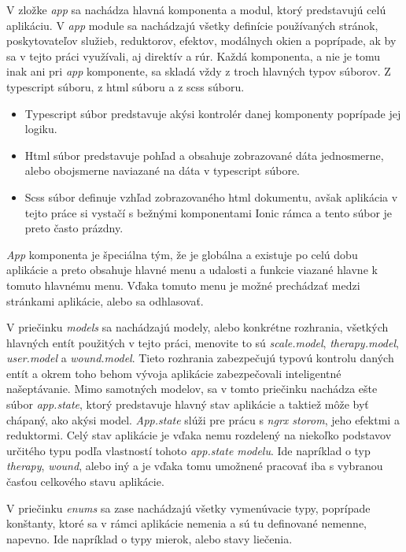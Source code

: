 V zložke \textit{app} sa nachádza hlavná komponenta a modul, ktorý predstavujú celú aplikáciu. V \textit{app} module sa nachádzajú všetky definície používaných stránok, poskytovateľov služieb, reduktorov, efektov, modálnych okien a poprípade, ak by sa v tejto práci využívali, aj direktív a rúr. Každá komponenta, a nie je tomu inak ani pri \textit{app} komponente, sa skladá vždy z troch hlavných typov súborov. Z typescript súboru, z html súboru a z scss súboru. 
\begin{itemize}
\item Typescript súbor predstavuje akýsi kontrolér danej komponenty poprípade jej logiku. 
\item Html súbor predstavuje pohľad a obsahuje zobrazované dáta jednosmerne, alebo obojsmerne naviazané na dáta v typescript súbore. 
\item Scss súbor definuje vzhľad zobrazovaného html dokumentu, avšak aplikácia v tejto práce si vystačí s bežnými komponentami Ionic rámca a tento súbor je preto často prázdny.
\end{itemize}
\textit{App} komponenta je špeciálna tým, že je globálna a existuje po celú dobu aplikácie a
preto obsahuje hlavné menu a udalosti a funkcie viazané hlavne k tomuto hlavnému menu. Vďaka tomuto menu je možné prechádzať medzi stránkami aplikácie, alebo sa odhlasovať.

V priečinku \textit{models} sa nachádzajú modely, alebo konkrétne rozhrania, všetkých hlavných entít použitých v tejto práci, menovite to sú \textit{scale.model}, \textit{therapy.model}, \textit{user.model} a \textit{wound.model}. Tieto rozhrania zabezpečujú typovú kontrolu daných entít a okrem toho behom vývoja aplikácie zabezpečovali inteligentné našeptávanie. Mimo samotných modelov, sa v tomto priečinku nachádza ešte súbor \textit{app.state}, ktorý predstavuje hlavný stav aplikácie a taktiež môže byť chápaný, ako akýsi model. \textit{App.state} slúži pre prácu s \textit{ngrx storom}, jeho efektmi a reduktormi. Celý stav aplikácie je vďaka nemu rozdelený na niekoľko podstavov určitého typu podľa vlastností tohoto \textit{app.state modelu}. Ide napríklad o typ \textit{therapy}, \textit{wound}, alebo iný a je vďaka tomu umožnené pracovať iba s vybranou časťou celkového stavu aplikácie.

V priečinku \textit{enums} sa zase nachádzajú všetky vymenúvacie typy, poprípade konštanty, ktoré sa v rámci aplikácie nemenia a sú tu definované nemenne, napevno. Ide napríklad o typy mierok, alebo stavy liečenia.


